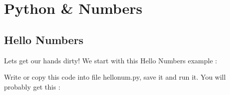 
\chapter{Python \& Numbers}

\section{Hello Numbers}

Lets get our hands dirty! We start with this {\color{cyan} Hello Numbers} example :


Write or copy this code into file {\color{magenta} hellonum.py,}  save it and run it. You will probably get this :



